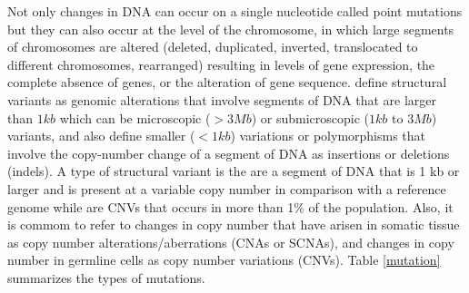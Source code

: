 Not only changes in DNA can occur on a single nucleotide called point mutations but they can
also occur at the level of the chromosome, in which large segments of chromosomes are altered
(deleted, duplicated, inverted, translocated to different chromosomes, rearranged)
resulting in levels of gene expression, the complete absence of genes, or the alteration of gene sequence.
 define structural variants as genomic alterations that involve segments
of DNA that are larger than $1 kb$ which can be microscopic ($> 3Mb$) or submicroscopic ($1 kb$ to $3 Mb$) variants,
and also define smaller ($<1 kb$) variations or polymorphisms that involve the copy-number change
 of a segment of DNA as insertions or deletions (indels).
A type of structural variant is the  are a segment of DNA that is 1 kb or larger and is present at a variable copy number in comparison with a reference genome while  are CNVs that occurs in more than 1\% of the population. Also, it is commom to refer to changes in copy number that have arisen in somatic tissue as copy number alterations/aberrations (CNAs or SCNAs), and changes in copy number in germline cells
 as copy number variations (CNVs).
Table \ref{mutation} summarizes the types of mutations.




